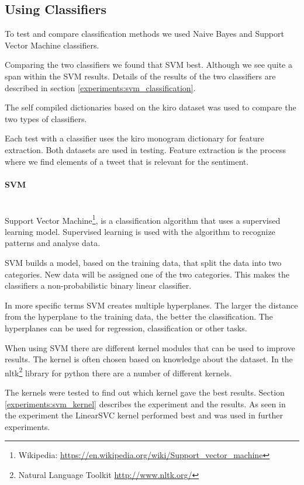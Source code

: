 \subsection{Using Classifiers}\label{sentiment:classifier_classification}
To test and compare classification methods we used Naive Bayes and
Support Vector Machine classifiers. 

Comparing the two classifiers we found that SVM best. Although we see quite a
span within the SVM results. Details of the results of the two classifiers are
described in section \ref{experiments:svm_classification}. 

The self compiled dictionaries based on the kiro dataset was used to compare
the two types of classifiers. 

Each test with a classifier uses the kiro monogram dictionary for feature
extraction. Both datasets are used in testing.
Feature extraction is the process where we find elements of a tweet that is
relevant for the sentiment.  

\paragraph{SVM}\label{sentiment:svm_classification}
\hspace{0pt}\\
Support Vector Machine\footnote{Wikipedia:
\url{https://en.wikipedia.org/wiki/Support_vector_machine}}, is a classification
algorithm that uses a supervised learning model. Supervised learning is used
with the algorithm to recognize patterns and analyse data. 

SVM builds a model, based on the training data, that split the data into two
categories. New data will be assigned one of the two categories. This makes the
classifiers a non-probabilistic binary linear classifier. 

In more specific terms SVM creates multiple hyperplanes. The larger the
distance from the hyperplane to the training data, the better the
classification. The hyperplanes can be used for regression, classification or
other tasks. 

When using SVM there are different kernel modules that can be used
to improve results. The kernel is often chosen based on knowledge about the
dataset. In the nltk\footnote{Natural Language Toolkit
\url{http://www.nltk.org/}} library for python there are a number of different
kernels. 

The kernels were tested to find out which kernel gave the best results. Section
\ref{experiments:svm_kernel} describes the experiment and the results. As
seen in the experiment the LinearSVC kernel performed best and was used in
further experiments.
%

